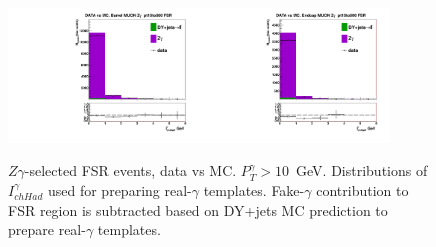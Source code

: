 \begin{figure}[htb]
  \begin{center}
   \includegraphics[width=0.45\textwidth]{../figs/figs_v11/MUON_ZGamma/PrepareYields/c_TotalDATAvsMC_Barrel__phoPFChIsoCorrFSR_pt15to500_FSR.pdf}\includegraphics[width=0.45\textwidth]{../figs/figs_v11/MUON_ZGamma/PrepareYields/c_TotalDATAvsMC_Endcap__phoPFChIsoCorrFSR_pt15to500_FSR.pdf}\\
  \caption{$Z\gamma$-selected FSR events, data vs MC. $P_T^{\gamma}>10$~GeV. Distributions of $I_{chHad}^{\gamma}$ used for preparing real-$\gamma$ templates. Fake-$\gamma$ contribution to FSR region is subtracted based on DY+jets MC prediction to prepare real-$\gamma$ templates.}
  \label{fig:Zg_FSR_phoPFChIsoCorr}
  \end{center}
\end{figure}

